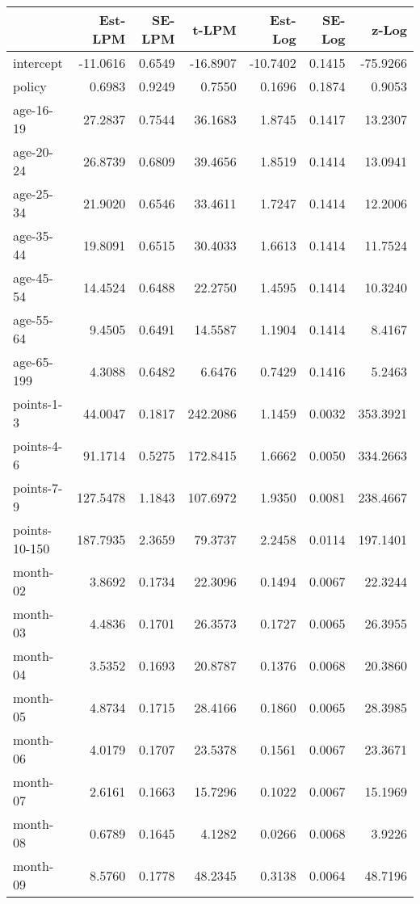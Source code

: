 \documentclass[10pt]{article}
\begin{document}
\begin{table}[ht]
\centering
\begin{tabular}{lrrrrrr}
  \hline
 & Est-LPM & SE-LPM & t-LPM & Est-Log & SE-Log & z-Log \\ 
  \hline
intercept & -11.0616 & 0.6549 & -16.8907 & -10.7402 & 0.1415 & -75.9266 \\ 
  policy & 0.6983 & 0.9249 & 0.7550 & 0.1696 & 0.1874 & 0.9053 \\ 
  age-16-19 & 27.2837 & 0.7544 & 36.1683 & 1.8745 & 0.1417 & 13.2307 \\ 
  age-20-24 & 26.8739 & 0.6809 & 39.4656 & 1.8519 & 0.1414 & 13.0941 \\ 
  age-25-34 & 21.9020 & 0.6546 & 33.4611 & 1.7247 & 0.1414 & 12.2006 \\ 
  age-35-44 & 19.8091 & 0.6515 & 30.4033 & 1.6613 & 0.1414 & 11.7524 \\ 
  age-45-54 & 14.4524 & 0.6488 & 22.2750 & 1.4595 & 0.1414 & 10.3240 \\ 
  age-55-64 & 9.4505 & 0.6491 & 14.5587 & 1.1904 & 0.1414 & 8.4167 \\ 
  age-65-199 & 4.3088 & 0.6482 & 6.6476 & 0.7429 & 0.1416 & 5.2463 \\ 
  points-1-3 & 44.0047 & 0.1817 & 242.2086 & 1.1459 & 0.0032 & 353.3921 \\ 
  points-4-6 & 91.1714 & 0.5275 & 172.8415 & 1.6662 & 0.0050 & 334.2663 \\ 
  points-7-9 & 127.5478 & 1.1843 & 107.6972 & 1.9350 & 0.0081 & 238.4667 \\ 
  points-10-150 & 187.7935 & 2.3659 & 79.3737 & 2.2458 & 0.0114 & 197.1401 \\ 
  month-02 & 3.8692 & 0.1734 & 22.3096 & 0.1494 & 0.0067 & 22.3244 \\ 
  month-03 & 4.4836 & 0.1701 & 26.3573 & 0.1727 & 0.0065 & 26.3955 \\ 
  month-04 & 3.5352 & 0.1693 & 20.8787 & 0.1376 & 0.0068 & 20.3860 \\ 
  month-05 & 4.8734 & 0.1715 & 28.4166 & 0.1860 & 0.0065 & 28.3985 \\ 
  month-06 & 4.0179 & 0.1707 & 23.5378 & 0.1561 & 0.0067 & 23.3671 \\ 
  month-07 & 2.6161 & 0.1663 & 15.7296 & 0.1022 & 0.0067 & 15.1969 \\ 
  month-08 & 0.6789 & 0.1645 & 4.1282 & 0.0266 & 0.0068 & 3.9226 \\ 
  month-09 & 8.5760 & 0.1778 & 48.2345 & 0.3138 & 0.0064 & 48.7196 \\ 

\end{tabular}
\end{table}
\end{document}

